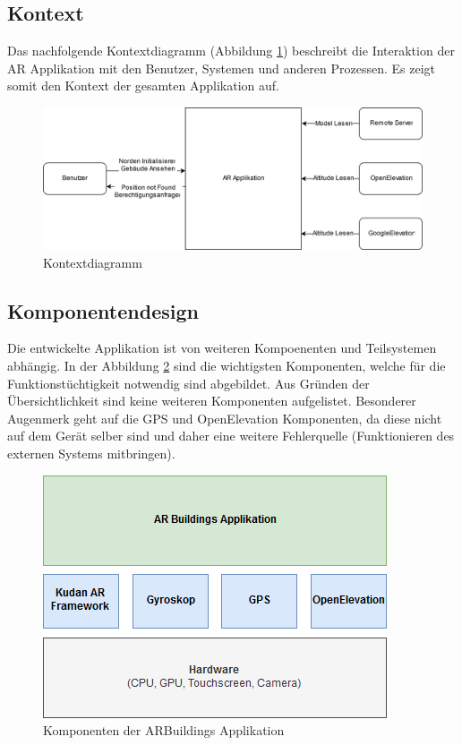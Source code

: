 \documentclass[a4paper]{scrreprt}
\begin{document}
\subsection{Kontext}
Das nachfolgende Kontextdiagramm (Abbildung \ref{fig:Kontext}) beschreibt die Interaktion der AR Applikation mit den Benutzer, Systemen und anderen Prozessen. Es zeigt somit den Kontext der gesamten Applikation auf.

\begin{figure}[h!]
	\includegraphics[keepaspectratio, width=\textwidth]{KontextDiagram.png}
	\caption{Kontextdiagramm}
	\label{fig:Kontext}
\end{figure}

\clearpage

\subsection{Komponentendesign}

Die entwickelte Applikation ist von weiteren Kompoenenten und Teilsystemen abhängig. In der Abbildung \ref{fig:Komponentendesign} sind die wichtigsten Komponenten, welche für die Funktionstüchtigkeit notwendig sind abgebildet. Aus Gründen der Übersichtlichkeit sind keine weiteren Komponenten aufgelistet.
\bigbreak
Besonderer Augenmerk geht auf die GPS und OpenElevation Komponenten, da diese nicht auf dem Gerät selber sind und daher eine weitere Fehlerquelle (Funktionieren des externen Systems mitbringen).

\begin{figure}[h!]
	\centering
	\includegraphics[width=0.7\linewidth, keepaspectratio]{Komponentendesign}
	\caption{Komponenten der ARBuildings Applikation}
	\label{fig:Komponentendesign}
\end{figure}
\end{document}
